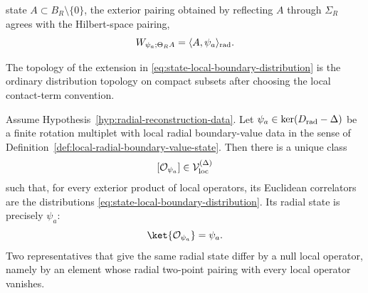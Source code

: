 \begin{definition}
\begin{enumerate}
  state \(A\subset B_R\setminus\{0\}\), the exterior pairing obtained by
  reflecting \(A\) through \(\Sigma_R\) agrees with the Hilbert-space pairing,
  \begin{equation}
    W_{\psi_a;\Theta_R A}
    =
    \langle A,\psi_a\rangle_{\rm rad}.
    \label{eq:local-boundary-value-pairing}
  \end{equation}
\end{enumerate}
The topology of the extension in
\eqref{eq:state-local-boundary-distribution} is the ordinary distribution
topology on compact subsets after choosing the local contact-term convention.
\end{definition}

\begin{theorem}
\label{thm:operator-from-state-radial-boundary-value}
Assume Hypothesis~\ref{hyp:radial-reconstruction-data}.  Let
\(\psi_a\in\ker(D_{\rm rad}-\Delta)\) be a finite rotation multiplet with
local radial boundary-value data in the sense of
Definition~\ref{def:local-radial-boundary-value-state}.  Then there is a
unique class
\[
  [\mathcal O_{\psi_a}]
  \in
  \mathcal V_{\rm loc}^{(\Delta)}
\]
such that, for every exterior product of local operators, its Euclidean
correlators are the distributions
\eqref{eq:state-local-boundary-distribution}.  Its radial state is precisely
\(\psi_a\):
\begin{equation}
  \ket{\mathcal O_{\psi_a}}=\psi_a .
  \label{eq:operator-from-state-radial-state}
\end{equation}
Two representatives that give the same radial state differ by a null local
operator, namely by an element whose radial two-point pairing with every local
operator vanishes.
\end{theorem}

